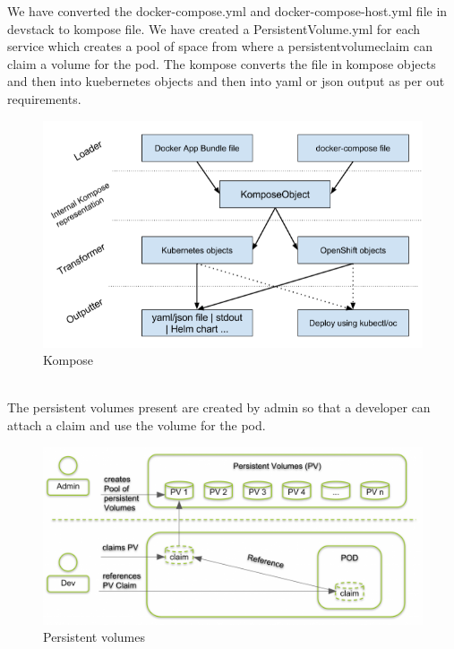 \documentclass[12pt]{article}
\begin{document}
We have converted the docker-compose.yml and docker-compose-host.yml file in devstack to kompose file. We have created a PersistentVolume.yml for each service which creates a pool of space from where a persistentvolumeclaim can claim a volume for the pod. The kompose converts the file in kompose objects and then into kuebernetes objects and then into yaml or json output as per out requirements.
\begin{figure}[h!]
	\begin{center}
		\includegraphics[totalheight=0.38\textheight]{kompose}
		\caption{Kompose \cite{Kompose}}
	\end{center}
\end{figure}
\\The persistent volumes present are created by admin so that a developer can attach a claim and use the volume for the pod.
\begin{figure}[h!]
	\begin{center}
		\includegraphics[totalheight=0.33\textheight]{persistentvolumes}
		\caption{Persistent volumes \cite{Persistent}}
	\end{center}
\end{figure}
\\\\\\\\\\
\end{document}
